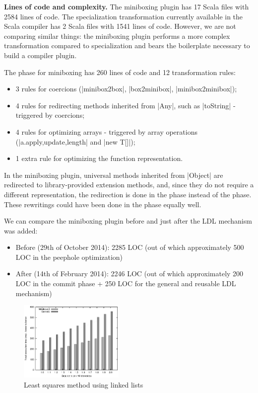 \textbf{Lines of code and complexity.} The miniboxing plugin has 17 Scala files with 2584 lines of code. The specialization transformation currently available in the Scala compiler \cite{iuli-thesis} has 2 Scala files with 1541 lines of code. However, we are not comparing similar things: the miniboxing plugin performs a more complex transformation compared to specialization and bears the boilerplate necessary to build a compiler plugin.

The \commit{} phase for miniboxing has 260 lines of code and 12 transformation rules:
\begin{itemize}
\item 3 rules for coercions (|minibox2box|, |box2minibox|, |minibox2minibox|);
\item 4 rules for redirecting methods inherited from |Any|, such as |toString| - triggered by coercions;
\item 4 rules for optimizing arrays - triggered by array operations (|a.{apply,update,length}| and |new T[]|);
\item 1 extra rule for optimizing the function representation.
\end{itemize}

In the miniboxing plugin, universal methods inherited from |Object| are redirected to library-provided extension methods, and, since they do not require a different representation, the redirection is done in the \commit{} phase instead of the \coerce{} phase. These rewritings could have been done in the \coerce{} phase equally well.

We can compare the miniboxing plugin before and just after the LDL mechanism was added:
\begin{itemize}
\item Before (29th of October 2014): 2285 LOC (out of which approximately 500 LOC in the peephole optimization)
\item After (14th of February 2014): 2246 LOC (out of which approximately 200 LOC in the commit phase + 250 LOC for the general and reusable LDL mechanism)
\end{itemize}


\begin{figure}
\centering
\includegraphics[width=0.45\textwidth]{graph.eps}
\caption{Least squares method using linked lists}
\label{fig:linkedlist}

\end{figure}

